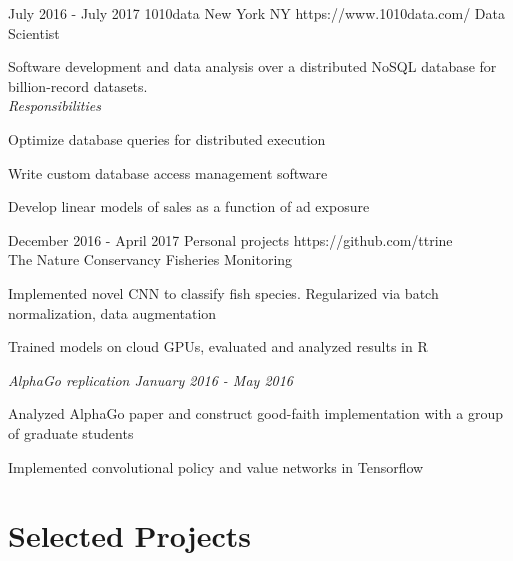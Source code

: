 \documentclass[10pt]{article}
\begin{document}
	\vspace{-15pt} %
	\job %
		{July 2016 - July 2017}
		{1010data}
		{New York NY}
		{https://www.1010data.com/}
		{Data Scientist}
		{Software development and data analysis over a distributed NoSQL database for billion-record datasets. \\

		\vspace{-7pt}
		\textit{Responsibilities}
		\begin{itemize-noindent}
			\vspace{7pt}
			\item Optimize database queries for distributed execution
			\item Write custom database access management software
			\item Develop linear models of sales as a function of ad exposure
		\end{itemize-noindent}}

	\vspace{-15pt}
	\job %
		{December 2016 - April 2017}
		{Personal projects}
		{}
		{https://github.com/ttrine}
		{\vspace{-7pt} \\
		The Nature Conservancy Fisheries Monitoring}
		{\vspace{-16pt}
		\begin{itemize-noindent}
			\vspace{7pt}
			\item Implemented novel CNN to classify fish species. Regularized via batch normalization, data augmentation
			\item Trained models on cloud GPUs, evaluated and analyzed results in R
		\end{itemize-noindent}

		\textit{AlphaGo replication \hfill January 2016 - May 2016}
		\begin{itemize-noindent}
			\vspace{7pt}
			\item Analyzed AlphaGo paper and construct good-faith implementation with a group of graduate students
			\item Implemented convolutional policy and value networks in Tensorflow
		\end{itemize-noindent}
		}

\section{Selected Projects}
\end{document}
